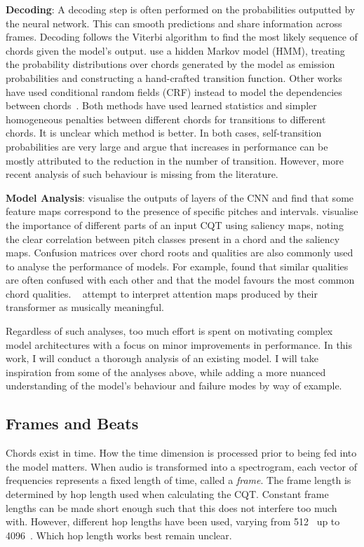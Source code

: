 \textbf{Decoding}: A decoding step is often performed on the probabilities outputted by the neural network. This can smooth predictions and share information across frames. Decoding follows the Viterbi algorithm to find the most likely sequence of chords given the model's output. \citet{BalanceRandomForestACR} use a hidden Markov model (HMM), treating the probability distributions over chords generated by the model as emission probabilities and constructing a hand-crafted transition function.  Other works have used conditional random fields (CRF) instead to model the dependencies between chords~\citep{ACRLargeVocab1}. Both methods have used learned statistics and simpler homogeneous penalties between different chords for transitions to different chords. It is unclear which method is better. In both cases, self-transition probabilities are very large and \citet{CommonVariations} argue that increases in performance can be mostly attributed to the reduction in the number of transition. However, more recent analysis of such behaviour is missing from the literature.

\textbf{Model Analysis}: \citet{FeatureMaps} visualise the outputs of layers of the CNN and find that some feature maps correspond to the presence of specific pitches and intervals. \citet{SaliencyChroma} visualise the importance of different parts of an input CQT using saliency maps, noting the clear correlation between pitch classes present in a chord and the saliency maps. Confusion matrices over chord roots and qualities are also commonly used to analyse the performance of models. For example, \citet{StructuredTraining} found that similar qualities are often confused with each other and that the model favours the most common chord qualities. ~\citet{BTC} attempt to interpret attention maps produced by their transformer as musically meaningful.

Regardless of such analyses, too much effort is spent on motivating complex model architectures with a focus on minor improvements in performance. In this work, I will conduct a thorough analysis of an existing model. I will take inspiration from some of the analyses above, while adding a more nuanced understanding of the model's behaviour and failure modes by way of example.

\subsection{Frames and Beats}

Chords exist in time. How the time dimension is processed prior to being fed into the model matters. When audio is  transformed into a spectrogram, each vector of frequencies represents a fixed length of time, called a \emph{frame}. The frame length is determined by hop length used when calculating the CQT. Constant frame lengths can be made short enough such that this does not interfere too much with. However, different hop lengths have been used, varying from 512~\cite{ACRLargeVocab1} up to 4096~\citep{StructuredTraining}. Which hop length works best remain unclear.

